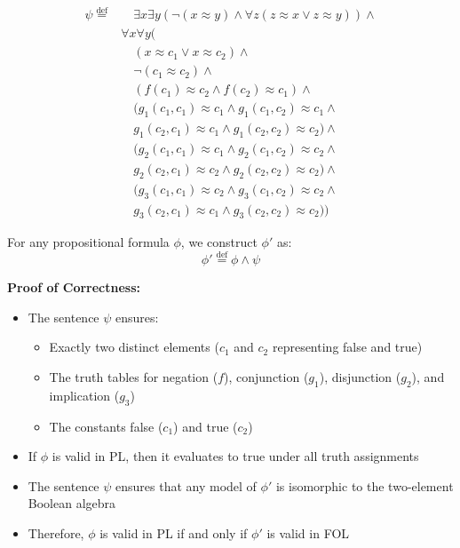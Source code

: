 \documentclass{article}
\newcommand{\defeq}{\stackrel{\text{def}}{=}}
\begin{document}
\[\begin{aligned}
\psi \defeq & \hspace{1em} \exists x \exists y (\neg(x \approx y) \land \forall z(z \approx x \lor z \approx y)) \land \\
& \forall x \forall y ( \\
& \quad (x \approx c_1 \lor x \approx c_2) \land \\
& \quad \neg(c_1 \approx c_2) \land \\
& \quad (f(c_1) \approx c_2 \land f(c_2) \approx c_1) \land \\
& \quad (g_1(c_1, c_1) \approx c_1 \land g_1(c_1, c_2) \approx c_1 \land \\
& \quad g_1(c_2, c_1) \approx c_1 \land g_1(c_2, c_2) \approx c_2) \land \\
& \quad (g_2(c_1, c_1) \approx c_1 \land g_2(c_1, c_2) \approx c_2 \land \\
& \quad g_2(c_2, c_1) \approx c_2 \land g_2(c_2, c_2) \approx c_2) \land \\
& \quad (g_3(c_1, c_1) \approx c_2 \land g_3(c_1, c_2) \approx c_2 \land \\
& \quad g_3(c_2, c_1) \approx c_1 \land g_3(c_2, c_2) \approx c_2))
\end{aligned}\]

For any propositional formula $\phi$, we construct $\phi'$ as:
\[\phi' \defeq \phi \land \psi\]

\textbf{Proof of Correctness:}
\begin{itemize}
    \item The sentence $\psi$ ensures:
    \begin{itemize}
        \item Exactly two distinct elements ($c_1$ and $c_2$ representing false and true)
        \item The truth tables for negation ($f$), conjunction ($g_1$), disjunction ($g_2$), and implication ($g_3$)
        \item The constants false ($c_1$) and true ($c_2$)
    \end{itemize}
    \item If $\phi$ is valid in PL, then it evaluates to true under all truth assignments
    \item The sentence $\psi$ ensures that any model of $\phi'$ is isomorphic to the two-element Boolean algebra
    \item Therefore, $\phi$ is valid in PL if and only if $\phi'$ is valid in FOL
\end{itemize}
\end{document}
